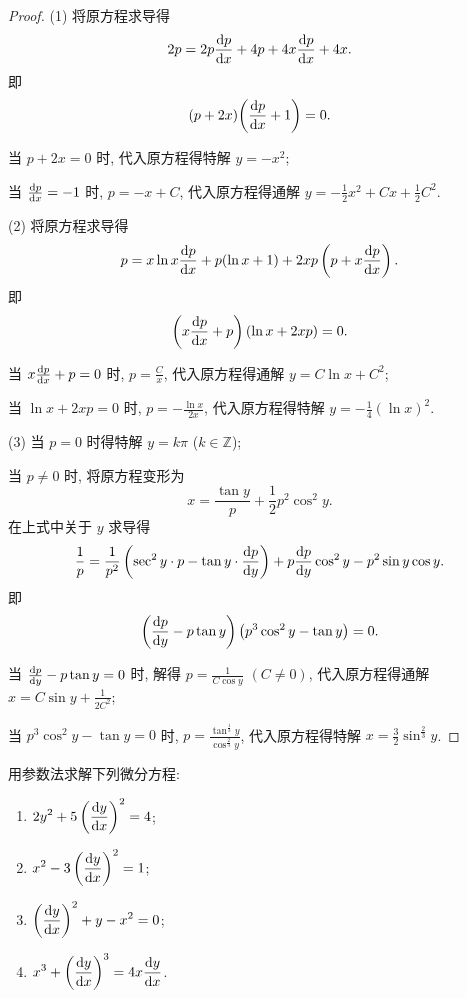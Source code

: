 \begin{proof}
  (1) 将原方程求导得
  \[2p=2p\frac{\mathop{}\!\mathrm{d} p}{\mathop{}\!\mathrm{d} x}+4p+4x\frac{\mathop{}\!\mathrm{d} p}{\mathop{}\!\mathrm{d} x}+4x.\]
  即
  \[(p+2x)\biggl(\frac{\mathop{}\!\mathrm{d} p}{\mathop{}\!\mathrm{d} x}+1\biggr)=0.\]

  当 $p+2x=0$ 时, 代入原方程得特解 $y=-x^2$;

  当 $\frac{\mathop{}\!\mathrm{d} p}{\mathop{}\!\mathrm{d} x}=-1$ 时, $p=-x+C$,
  代入原方程得通解 $y=-\frac{1}{2}x^2+Cx+\frac{1}{2}C^2$.

  (2) 将原方程求导得
  \[p=x\ln x\frac{\mathop{}\!\mathrm{d} p}{\mathop{}\!\mathrm{d} x}+p(\ln x+1)+2xp\left(p+x\frac{\mathop{}\!\mathrm{d} p}{\mathop{}\!\mathrm{d} x}\right).\]
  即
  \[\left(x\frac{\mathop{}\!\mathrm{d} p}{\mathop{}\!\mathrm{d} x}+p\right)(\ln x+2xp)=0.\]

  当 $x\frac{\mathop{}\!\mathrm{d} p}{\mathop{}\!\mathrm{d} x}+p=0$ 时, $p=\frac{C}{x}$, 代入原方程得通解 $y=C\ln x+C^2$;

  当 $\ln x+2xp=0$ 时, $p=-\frac{\ln x}{2x}$, 代入原方程得特解 $y=-\frac{1}{4}(\ln x)^2$.

  (3) 当 $p=0$ 时得特解 $y=k\pi$ ($k\in\mathbb{Z}$);

  当 $p\neq 0$ 时, 将原方程变形为
  \[x=\frac{\tan y}{p}+\frac{1}{2}p^2\cos^2y.\]
  在上式中关于 $y$ 求导得
  \[\frac{1}{p}=\frac{1}{p^2}\left(\sec^2y\cdot p-\tan y\cdot\frac{\mathop{}\!\mathrm{d} p}{\mathop{}\!\mathrm{d} y}\right)+p\frac{\mathop{}\!\mathrm{d} p}{\mathop{}\!\mathrm{d} y}\cos^2y-p^2\sin y\cos y.\]
  即
  \[\left(\frac{\mathop{}\!\mathrm{d} p}{\mathop{}\!\mathrm{d} y}-p\tan y\right)\left(p^3\cos^2y-\tan y\right)=0.\]

  当 $\frac{\mathop{}\!\mathrm{d} p}{\mathop{}\!\mathrm{d} y}-p\tan y=0$ 时, 
  解得 $p=\frac{1}{C\cos y}$ $(C\neq 0)$, 代入原方程得通解 $x=C\sin y+\frac{1}{2C^2}$;

  当 $p^3\cos^2y-\tan y=0$ 时, $p=\frac{\tan^{\frac{1}{3}}y}{\cos^{\frac{2}{3}}y}$,
  代入原方程得特解 $x=\frac{3}{2}\sin^{\frac{2}{3}}y$.
\end{proof}



\begin{exercise}
  用参数法求解下列微分方程:
  \begin{enumerate}[(1)]
  \item $\displaystyle 2y^2+5\left(\frac{\mathop{}\!\mathrm{d} y}{\mathop{}\!\mathrm{d} x}\right)^2=4$;
  \item $\displaystyle x^2-3\left(\frac{\mathop{}\!\mathrm{d} y}{\mathop{}\!\mathrm{d} x}\right)^2=1$;
  \item $\displaystyle\left(\frac{\mathop{}\!\mathrm{d} y}{\mathop{}\!\mathrm{d} x}\right)^2+y-x^2=0$;
  \item $\displaystyle x^3+\left(\frac{\mathop{}\!\mathrm{d} y}{\mathop{}\!\mathrm{d} x}\right)^3=4x\frac{\mathop{}\!\mathrm{d} y}{\mathop{}\!\mathrm{d} x}$.
  \end{enumerate}
\end{exercise}

